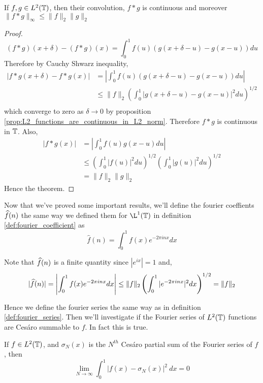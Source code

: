 \begin{proposition}
  \label{prop:convolution_of_L2_functions}
  If $f, g \in L^2(\mathbb T)$, then their convolution, $f*g$ is continuous and moreover $\|f*g\|_{\infty} \le \|f\|_2 \|g\|_2$
\end{proposition}
\begin{proof}
  $$(f*g)(x+\delta) - (f*g)(x) = \int_0^1 f(u)(g(x+\delta - u) - g(x-u)) du $$
  Therefore by Cauchy Shwarz inequality, 
  \begin{align*}
    |f*g(x+\delta) - f*g(x)| &= \left| \int_0^1 f(u) (g(x + \delta -u)- g(x-u)) du \right| \\
          &\le \|f\|_2 \left( \int_0^1|g(x+\delta - u) - g(x-u)|^2 du \right)^{1/2} \\
  \end{align*}
  which converge to zero as $\delta \to 0$ by proposition \ref{prop:L2_functions_are_continuous_in_L2_norm}. Therefore $f*g$ is continuous in $\mathbb T$.
  Also, 
  \begin{align*}
    |f*g(x)| &= \left| \int_0^1 f(u)g(x-u) du \right| \\
            &\le \left(\int_0^1 |f(u)|^2 du \right)^{1/2} \left(\int_0^1 |g(u)|^2 du \right)^{1/2} \\
            &= \|f\|_2 \|g\|_2
  \end{align*}
  Hence the theorem.
\end{proof}

 Now that we've proved some important results, we'll define the fourier coeffients $\widehat{f}(n)$ the same way we defined them for $\L^1(\T)$ in definition \ref{def:fourier_coefficient} as 
$$\hat{f}(n) = \int_0^1 f(x)e^{-2\pi inx} dx$$

Note that $\widehat{f}(n)$ is a finite quantity since $|e^{ix}| = 1$ and,
$$ |\widehat{f}(n)| = \left| \int_0^1 f(x)e^{-2\pi inx} dx \right| \le \|f\|_2\left(\int_0^1 |e^{-2\pi inx}|^2 dx\right)^{1/2} = \|f\|_2 $$

Hence we define the fourier series the same way as in definition \ref{def:fourier_series}. Then we'll investigate if the Fourier series of $L^2(\mathbb T)$ functions are Ces\'aro summable to $f$. In fact this is true.

\begin{theorem}
  If $f\in L^2(\mathbb T)$, and $\sigma_N(x)$ is the $N^{th}$ Ces\'aro partial sum of the Fourier series of $f$, then
  $$ \lim_{N \to \infty} \int_0^1 |f(x) - \sigma_N(x)|^2 \ dx = 0$$
\end{theorem}

